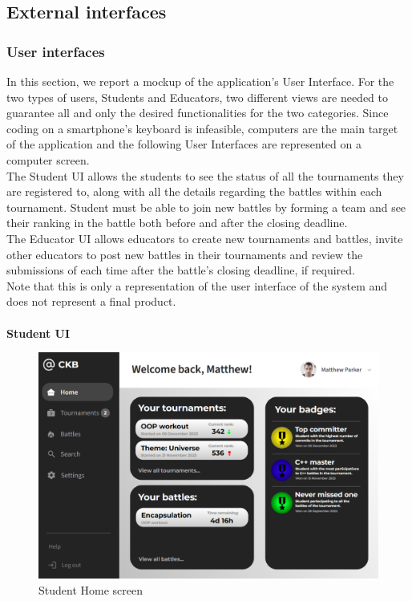 \subsection{External interfaces}
\subsubsection{User interfaces}
In this section, we report a mockup of the application’s User Interface. For the two types of users, Students and Educators, two different views are needed to guarantee all and only the desired functionalities for the two categories. Since coding on a smartphone’s keyboard is infeasible, computers are the main target of the application and the following User Interfaces are represented on a computer screen.\\
The Student UI allows the students to see the status of all the tournaments they are registered to, along with all the details regarding the battles within each tournament. Student must be able to join new battles by forming a team and see their ranking in the battle both before and after the closing deadline.\\
The Educator UI allows educators to create new tournaments and battles, invite other educators to post new battles in their tournaments and review the submissions of each time after the battle’s closing deadline, if required.\\
Note that this is only a representation of the user interface of the system and does not represent a final product.\\
\\
\textbf{Student UI}\\
\begin{figure}[htp!]
    \centering
    \includegraphics[width=0.9\linewidth]{Images/UI_Student_Home.png}
    \caption{Student Home screen}
    \label{fig:enter-label}
\end{figure}
